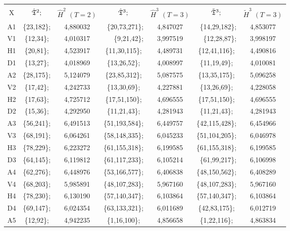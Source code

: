 \begin{multicols}{2}
\begin{table*}[b]
\begin{center}
\begin{tabular}{|c|cc|cc|cc|}
\hline
&&&&&&\\[-9pt]
 X & $\hat{\frak T}^2;$ & $\hat{H}^2$ $(T=2)$ & $\hat{\frak T}^3;$ &
  $\hat{H}^3$ $(T=3)$ & 
$\tilde{\frak T}^3;$ & $\tilde{H}^3$ $(T=3)$ \\
\hline
A1 & \{23,182\}; &  4,880032 & ~\{20,73,271\}; &  4,847027 & ~\{14,29,182\}; &  4,853077 \\
V1 & \{12,34\}; &  4,010317 & ~~~\{9,21,42\}; &  3,997519 & ~~\{12,28,87\}; &  3,998197\\
H1 & \{20,81\}; &  4,523917 & \{11,30,115\}; &  4,489731 & \{12,41,116\}; &  4,490816\\
D1 & \{13,27\}; &  4,018969 & \{13,26,52\}; &  4,008997 & \{11,19,49\}; &  4,010081\\
A2 & \{28,175\}; &  5,124079 &\{23,85,312\}; &  5,087575 &\{13,35,175\}; &  5,096258\\
V2 & \{17,42\}; &  4,242733 & \{13,30,69\}; &  4,227881 & \{13,26,69\}; &  4,228058\\
H2 & \{17,63\}; &  4,725712 & \{17,51,150\}; &  4,696555 &\{17,51,150\}; &  4,696555\\
D2 & \{15,36\}; &  4,292950 & \{11,21,43\}; &  4,281943 & \{11,21,43\}; &  4,281943\\
A3 & \{56,241\}; &  6,491513 & \{51,193,584\}; &  6,449757 & \{42,115,428\}; &  6,454966\\
V3 & \{68,191\}; &  6,064261 & \{58,148,335\}; &  6,045233 & \{51,104,205\}; &  6,046978\\
H3 & \{78,229\}; &  6,223272 & \{61,155,318\}; &  6,199585 & \{61,155,318\}; &  6,199585\\
D3 & \{64,145\}; &  6,119812 & \{61,117,233\}; &  6,105214 & ~\{61,99,217\}; &  6,106998\\
A4 & \{62,276\}; &  6,448976 & \{53,166,577\}; &  6,406838 & \{48,150,562\}; &  6,408289\\
V4 & \{68,203\}; &  5,985891 & \{48,107,283\}; &  5,967160 & \{48,107,283\}; &  5,967160\\
H4 & \{78,230\}; &  6,130190 & \{57,140,347\}; &  6,103864 & \{57,140,347\}; &  6,103864\\
D4 & \{69,147\}; &  6,024354 & \{63,133,321\}; &  6,011689 & \{42,83,175\}; &  6,012719\\
A5 & \{12,92\}; &  4,942235 & \{1,16,100\}; &  4,856658 & \{1,22,116\}; &  4,863834\\

\end{tabular}
\end{center}
\end{table*}
\end{multicols}

